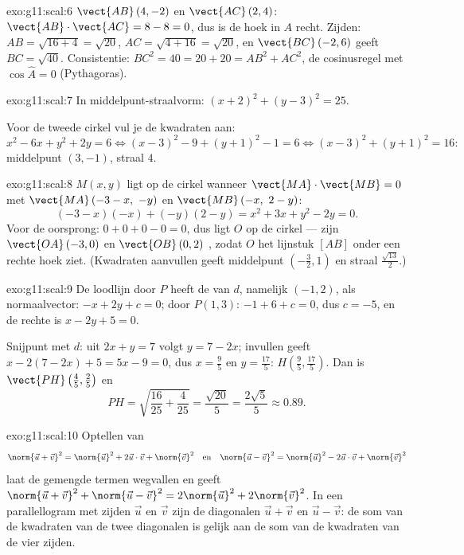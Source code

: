 \begin{solution}{exo:g11:scal:6}
$\vect{AB}\,(4, -2)$ en $\vect{AC}\,(2, 4)$:
$\vect{AB}\cdot\vect{AC} = 8 - 8 = 0$, dus is de hoek in $A$ recht. Zijden:
$AB = \sqrt{16 + 4} = \sqrt{20}$, $AC = \sqrt{4 + 16} = \sqrt{20}$, en
$\vect{BC}\,(-2, 6)$ geeft $BC = \sqrt{40}$. Consistentie:
$BC^2 = 40 = 20 + 20 = AB^2 + AC^2$, de cosinusregel met
$\cos\widehat A = 0$ (Pythagoras).
\end{solution}

\begin{solution}{exo:g11:scal:7}
In middelpunt-straalvorm: $(x + 2)^2 + (y - 3)^2 = 25$.

Voor de tweede cirkel vul je de kwadraten aan:
\[
x^2 - 6x + y^2 + 2y = 6
\iff (x - 3)^2 - 9 + (y + 1)^2 - 1 = 6
\iff (x-3)^2 + (y+1)^2 = 16 :
\]
middelpunt $(3, -1)$, straal $4$.
\end{solution}

\begin{solution}{exo:g11:scal:8}
$M(x,y)$ ligt op de cirkel wanneer $\vect{MA}\cdot\vect{MB} = 0$ met
$\vect{MA}\,(-3 - x,\ -y)$ en $\vect{MB}\,(-x,\ 2 - y)$:
\[
(-3 - x)(-x) + (-y)(2 - y) = x^2 + 3x + y^2 - 2y = 0 .
\]
Voor de oorsprong: $0 + 0 + 0 - 0 = 0$, dus ligt $O$ op de cirkel ---
 zijn $\vect{OA}\,(-3,0)$ en $\vect{OB}\,(0,2)$ ,
zodat $O$ het lijnstuk $[AB]$ onder een rechte hoek ziet. (Kwadraten
aanvullen geeft middelpunt $\left(-\frac32, 1\right)$ en straal
$\frac{\sqrt{13}}{2}$.)
\end{solution}

\begin{solution}{exo:g11:scal:9}
De loodlijn door $P$ heeft de  van $d$, namelijk $(-1, 2)$,
als normaalvector:  $-x + 2y + c = 0$; door $P(1,3)$:
$-1 + 6 + c = 0$, dus $c = -5$, en de rechte is $x - 2y + 5 = 0$.

Snijpunt met $d$: uit $2x + y = 7$ volgt $y = 7 - 2x$; invullen geeft
$x - 2(7 - 2x) + 5 = 5x - 9 = 0$, dus $x = \frac95$ en $y = \frac{17}5$:
$H\left(\frac95, \frac{17}5\right)$. Dan is
$\vect{PH}\left(\frac45, \frac25\right)$ en
\[
PH = \sqrt{\frac{16}{25} + \frac{4}{25}} = \frac{\sqrt{20}}{5}
= \frac{2\sqrt5}{5} \approx 0.89 .
\]
\end{solution}

\begin{solution}{exo:g11:scal:10}
Optellen van
\[
\norm{\vec u + \vec v}^2 = \norm{\vec u}^2 + 2\vec u\cdot\vec v +
\norm{\vec v}^2
\quad\text{en}\quad
\norm{\vec u - \vec v}^2 = \norm{\vec u}^2 - 2\vec u\cdot\vec v +
\norm{\vec v}^2
\]
laat de gemengde termen wegvallen en geeft
$\norm{\vec u + \vec v}^2 + \norm{\vec u - \vec v}^2 = 2\norm{\vec u}^2 +
2\norm{\vec v}^2$. In een parallellogram met zijden $\vec u$ en $\vec v$
zijn de diagonalen $\vec u + \vec v$ en $\vec u - \vec v$: de som van de
kwadraten van de twee diagonalen is gelijk aan de som van de kwadraten van
de vier zijden.
\end{solution}

